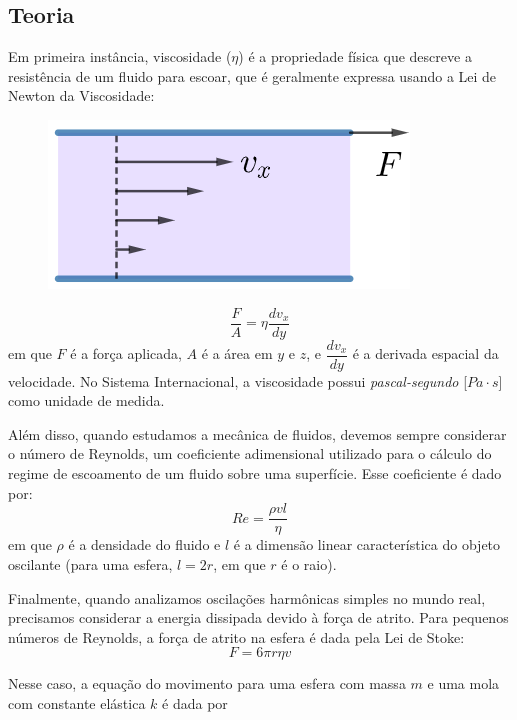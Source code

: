 \documentclass[a4paper, 12pt]{article}
\begin{document}
\begin{multicols}{2}
		\section{Teoria} \label{sec:teoria}
			\par Em primeira instância, viscosidade ($\eta$) é a propriedade física que descreve a resistência de um fluido para escoar, que é geralmente expressa usando a Lei de Newton da Viscosidade:
			\begin{figure}[H]
				\centering
				\includegraphics[scale=0.6]{./img/viscosidade.png}
			\end{figure}
			\begin{equation}
				\frac{F}{A} = \eta \dfrac{dv_x}{dy}
			\end{equation}
			em que $F$ é a força aplicada, $A$ é a área em $y$ e $z$, e $\dfrac{dv_x}{dy}$ é a derivada espacial da velocidade. No Sistema Internacional, a viscosidade possui \textit{pascal-segundo} [$Pa \cdot s$] como unidade de medida.
			\par Além disso, quando estudamos a mecânica de fluidos, devemos sempre considerar o número de Reynolds, um coeficiente adimensional utilizado para o cálculo do regime de escoamento de um fluido sobre uma superfície. Esse coeficiente é dado por:
			\begin{equation}
				Re = \frac{\rho v l}{\eta}
			\end{equation}
			em que $\rho$ é a densidade do fluido e $l$ é a dimensão linear característica do objeto oscilante (para uma esfera, $l = 2 r$, em que $r$ é o raio).
			\par Finalmente, quando analizamos oscilações harmônicas simples no mundo real, precisamos considerar a energia dissipada devido à força de atrito. Para pequenos números de Reynolds, a força de atrito na esfera é dada pela Lei de Stoke:
			\begin{equation}
				F = 6 \pi r \eta v
			\end{equation}
			\par Nesse caso, a equação do movimento para uma esfera com massa $m$ e uma mola com constante elástica $k$ é dada por

\end{multicols}
\end{document}
